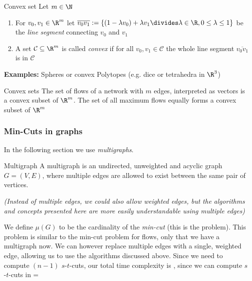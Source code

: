 \begin{definition}[]{Convex set}
    Let $m \in \N$
    \begin{enumerate}[label=(\roman*)]
        \item For $v_0, v_1 \in \R^m$ let $\overline{v_0v_1}:=\{(1 - \lambda v_0) + \lambda v_1 \divides \lambda \in \R, 0 \leq \lambda \leq 1\}$ be the \textit{line segment} connecting $v_0$ and $v_1$
        \item A set $\mathcal{C} \subseteq \R^m$ is called \textit{convex} if for all $v_0, v_1 \in \mathcal{C}$ the whole line segment $\overline{v_0 v_1}$ is in $\mathcal{C}$
    \end{enumerate}
\end{definition}
\textbf{Examples:} Spheres or convex Polytopes (e.g. dice or tetrahedra in $\R^3$)
\begin{theorem}[]{Convex sets}
    The set of flows of a network with $m$ edges, interpreted as vectors is a convex subset of $\R^m$. The set of all maximum flows equally forms a convex subset of $\R^m$
\end{theorem}


\newpage
\subsubsection{Min-Cuts in graphs}
In the following section we use \textit{multigraphs}.
\begin{recall}[]{Multigraph}
    A multigraph is an undirected, unweighted and acyclic graph $G = (V, E)$, where multiple edges are allowed to exist between the same pair of vertices.

    \textit{(Instead of multiple edges, we could also allow weighted edges, but the algorithms and concepts presented here are more easily understandable using multiple edges)}
\end{recall}


We define $\mu(G)$ to be the cardinality of the \textit{min-cut} (this is the problem).
This problem is similar to the min-cut problem for flows, only that we have a multigraph now. We can however replace multiple edges with a single, weighted edge, allowing us to use the algorithms discussed above.
Since we need to compute $(n - 1)$ $s$-$t$-cuts, our total time complexity is , since we can compute $s$-$t$-cuts in  = 




